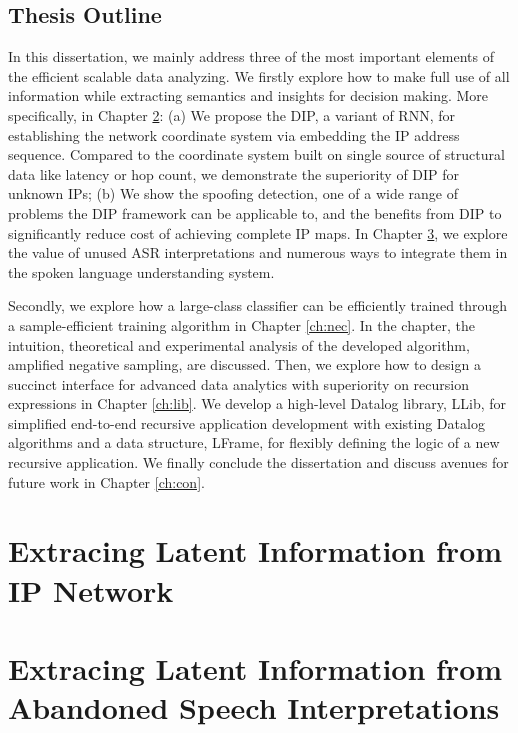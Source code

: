 \documentclass [PhD] {uclathes}
\begin{document}
\section{Thesis Outline}

In this dissertation, we mainly address  three of the most important elements of the efficient scalable data analyzing. We firstly explore how to make full use of all information while extracting semantics and insights for decision making. More specifically, in  Chapter \ref{ch:dip}: (a) We propose the DIP, a variant of RNN, for establishing the network coordinate system via embedding the IP address sequence. Compared to the coordinate system built on single source of structural data like latency or hop count, we demonstrate the superiority of DIP for unknown IPs; (b) We show the spoofing detection, one of a wide range of problems the DIP framework can be applicable to, and the benefits from DIP to   significantly reduce cost of achieving complete IP maps. In Chapter \ref{ch:nbest}, we explore the value of unused ASR interpretations and numerous ways to integrate them in the  spoken language understanding system.   

Secondly, we explore how a 
  large-class classifier can be  efficiently trained through a sample-efficient training algorithm in Chapter \ref{ch:nec}. In the chapter, the intuition, theoretical and experimental analysis of the  developed algorithm, amplified negative sampling, are  discussed.  Then, we explore how to design a succinct interface for advanced data analytics with superiority on recursion expressions in Chapter \ref{ch:lib}. We develop a high-level Datalog library, LLib,  for simplified end-to-end recursive application development with existing Datalog algorithms and a data structure, LFrame, for flexibly defining  the logic of a new recursive application. We finally conclude the dissertation and discuss avenues for future work in Chapter \ref{ch:con}.
  
  




\chapter{Extracing Latent  Information from IP Network}
\label{ch:dip}



\chapter{Extracing Latent Information from Abandoned Speech Interpretations}
\label{ch:nbest}
\end{document}
